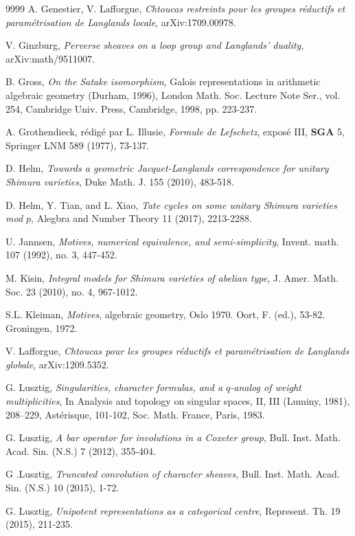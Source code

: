 \begin{thebibliography}{9999}
A. Genestier, V. Lafforgue, \emph{Chtoucas restreints pour les groupes r\'eductifs et param\'etrisation de Langlands locale}, arXiv:1709.00978.

V. Ginzburg, \emph{Perverse sheaves on a loop group and Langlands' duality}, arXiv:math/9511007.

B. Gross, \emph{On the Satake isomorphism}, Galois representations in arithmetic algebraic geometry (Durham, 1996), London Math. Soc. Lecture Note Ser., vol. 254, Cambridge Univ. Press, Cambridge, 1998, pp. 223-237.

A. Grothendieck, r\'edig\'e par L. Illusie, \emph{Formule de Lefschetz}, expos\'e III, \textbf{SGA} 5, Springer LNM 589 (1977), 73-137.

 D. Helm, \emph{Towards a geometric Jacquet-Langlands correspondence for unitary Shimura varieties}, Duke Math. J. 155 (2010), 483-518.

 D. Helm, Y. Tian, and L. Xiao, \emph{Tate cycles on some unitary Shimura varieties mod $p$}, Alegbra and Number Theory 11 (2017), 2213-2288.

U. Jannsen, \emph{Motives, numerical equivalence, and semi-simplicity}, Invent. math. 107 (1992), no. 3, 447-452.

 M. Kisin, \emph{Integral models for Shimura varieties of abelian type}, J. Amer. Math. Soc. 23 (2010), no. 4, 967-1012.

S.L. Kleiman, \emph{Motives}, algebraic geometry, Oslo 1970. Oort, F. (ed.), 53-82. Groningen, 1972.

 V. Lafforgue, \emph{Chtoucas pour les groupes r\'eductifs et param\'etrisation de Langlands globale}, arXiv:1209.5352.

G. Lusztig, \emph{Singularities, character formulas, and a $q$-analog of weight multiplicities}, In Analysis and topology on singular spaces, II, III (Luminy, 1981), 208--229, Ast\'erisque, 101-102, Soc. Math. France, Paris, 1983.

G. Lusztig, \emph{A bar operator for involutions in a Coxeter group}, Bull. Inst. Math. Acad. Sin. (N.S.) 7 (2012), 355-404.

G .Lusztig, \emph{Truncated convolution of character sheaves}, Bull. Inst. Math. Acad. Sin. (N.S.) 10 (2015), 1-72.

G. Lusztig, \emph{Unipotent representations as a categorical centre}, Represent. Th. 19 (2015), 211-235.


\end{thebibliography}
